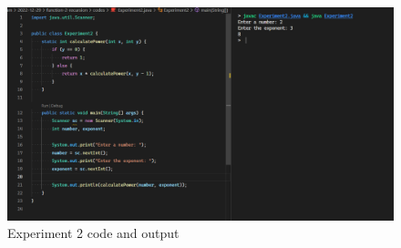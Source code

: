 \documentclass[12pt,titlepage]{article}
\begin{document}
\begin{enumerate}
{        \begin{figure}[h]
            \includegraphics[width=\textwidth]{./images/experiment-two.png}
            \caption{Experiment 2 code and output}
        \end{figure}
    }
\end{enumerate}
\end{document}
